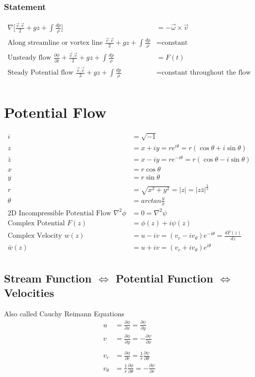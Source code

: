 \documentclass[11pt, letterpaper, notitlepage]{article}
\begin{document}
\subsubsection{Statement}
\begin{align*}
\nabla \Biggl[\frac{\vec{v}.\vec{v}}{2} + g z + \int \frac{dp}{\rho} \Biggr] &= -\vec{\omega} \times \vec{v} \\
\text{Along streamline or vortex line } \frac{\vec{v}.\vec{v}}{2} + g z + \int \frac{dp}{\rho} &= \text{constant}\\
\text{Unsteady flow } \frac{\partial \phi}{\partial t} + \frac{\vec{v}.\vec{v}}{2} + g z + \int \frac{dp}{\rho} &= F(t)\\
\text{Steady Potential flow } \frac{\vec{v}.\vec{v}}{2} + g z + \int \frac{dp}{\rho} &= \text{constant throughout the flow}\\
\end{align*}

\newpage
\section{Potential Flow}
\begin{align*}
i &= \sqrt{-1} \\
z &= x + i y = r e^{i \theta} = r (\cos{\theta} + i \sin{\theta}) \\
\bar{z} &= x - i y = r e^{-i \theta} = r (\cos{\theta} - i \sin{\theta}) \\
x &= r \cos{\theta} \\
y &= r \sin{\theta} \\
r &= \sqrt{x^2 + y^2} = |z| = |z \bar{z}|^{\frac{1}{2}} \\
\theta &= arctan{\frac{y}{x}} \\
\text{2D Incompressible Potential Flow } \nabla^2 \phi &= 0 = \nabla^2 \psi \\
\text{Complex Potential\ } F(z) &= \phi(z) + i \psi(z) \\
\text{Complex Velocity\ } w(z) &= u - i v = (v_r - i v_{\theta}) e^{-i \theta} = \frac{dF(z)}{dz} \\
\bar{w}(z) &= u + i v = (v_r + i v_{\theta}) e^{i \theta} \\
\end{align*}


\subsection{Stream Function $\Leftrightarrow$ Potential Function $\Leftrightarrow$ Velocities}
Also called Cauchy Reimann Equations
\begin{align*}
u &= \frac{\partial \phi}{\partial x} = \frac{\partial \psi}{\partial y} \\
v &= \frac{\partial \phi}{\partial y} = -\frac{\partial \psi}{\partial x} \\ \\
v_r &= \frac{\partial \phi}{\partial r} = \frac{1}{r} \frac{\partial \psi}{\partial \theta} \\
v_{\theta} &= \frac{1}{r} \frac{\partial \phi}{\partial \theta} = -\frac{\partial \psi}{\partial r} \\
\end{align*}
\end{document}
